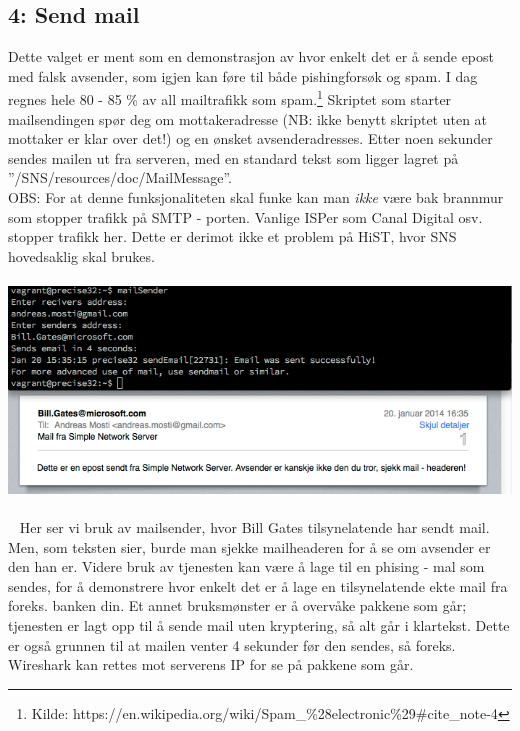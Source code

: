 \documentclass{article}
\begin{document}
\subsection{4: Send mail}
Dette valget er ment som en demonstrasjon av hvor enkelt det er å sende epost med falsk avsender, som igjen kan føre til både pishingforsøk og spam. I dag regnes hele 80 - 85 \% av all mailtrafikk som spam.\footnote{Kilde: https://en.wikipedia.org/wiki/Spam_\%28electronic\%29#cite_note-4} Skriptet som starter mailsendingen spør deg om mottakeradresse (NB: ikke benytt skriptet uten at mottaker er klar over det!) og en ønsket avsenderadresses. Etter noen sekunder sendes mailen ut fra serveren, med en standard tekst som ligger lagret på ''/SNS/resources/doc/MailMessage''. \\ OBS: For at denne funksjonaliteten skal funke kan man \textit{ikke} være bak brannmur som stopper trafikk på SMTP - porten. Vanlige ISPer som Canal Digital osv. stopper trafikk her. Dette er derimot ikke et problem på HiST, hvor SNS hovedsaklig skal brukes. 
\\ \\
\includegraphics[scale = 0.7]{pictures/mailsender.png}
\\ \\ 
Her ser vi bruk av mailsender, hvor Bill Gates tilsynelatende har sendt mail. Men, som teksten sier, burde man sjekke mailheaderen for å se om avsender er den han er. Videre bruk av tjenesten kan være å lage til en phising - mal som sendes, for å demonstrere hvor enkelt det er å lage en tilsynelatende ekte mail fra foreks. banken din. Et annet bruksmønster er å overvåke pakkene som går; tjenesten er lagt opp til å sende mail uten kryptering, så alt går i klartekst. Dette er også grunnen til at mailen venter 4 sekunder før den sendes, så foreks. Wireshark kan rettes mot serverens IP for se på pakkene som går. 
\end{document}
